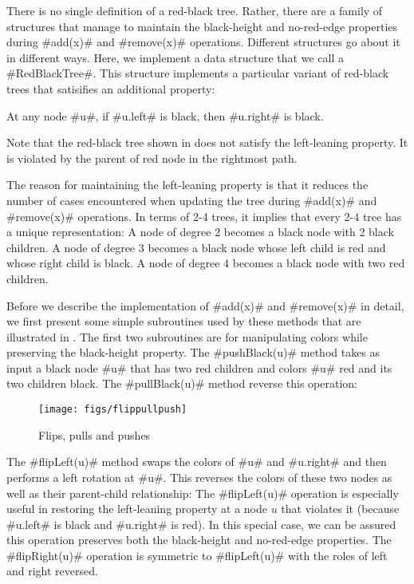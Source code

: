 There is no single definition of a red-black tree.  Rather,
there are a family of structures that manage to maintain the
black-height and no-red-edge properties during #add(x)# and #remove(x)#
operations. Different structures go about it in different ways.  Here, we
implement a data structure that we call a #RedBlackTree#.  This structure
implements a particular variant of red-black trees that satisifies an
additional property:
\begin{prp}
  At any node #u#, if #u.left# is black, then #u.right# is black.
\end{prp}
Note that the red-black tree shown in   does
not satisfy the left-leaning property.  It is violated by the parent of
red node in the rightmost path.

The reason for maintaining the left-leaning property is that it reduces
the number of cases encountered when updating the tree during #add(x)#
and #remove(x)# operations.  In terms of 2-4 trees, it implies that
every 2-4 tree has a unique representation:  A node of degree 2 becomes
a black node with 2 black children.  A node of degree 3 becomes a black
node whose left child is red and whose right child is black.  A node of
degree 4 becomes a black node with two red children.

Before we describe the implementation of #add(x)# and #remove(x)# in
detail, we first present some simple subroutines used by these methods
that are illustrated in .  The first two
subroutines are for manipulating colors while preserving the black-height
property. The #pushBlack(u)# method takes as input a black node #u#
that has two red children and colors #u# red and its two children black.
The #pullBlack(u)# method reverse this operation:

\begin{figure}
  \begin{center}
    \texttt{[image: figs/flippullpush]}
  \end{center}
  \caption{Flips, pulls and pushes}
\end{figure}

The #flipLeft(u)# method swaps the colors of #u# and #u.right# and
then performs a left rotation at #u#.  This reverses the colors
of these two nodes as well as their parent-child relationship:
 The #flipLeft(u)# operation
is especially useful in restoring the left-leaning property at a node
$u$ that violates it (because #u.left# is black and #u.right# is red).
In this special case, we can be assured this operation preserves both the
black-height and no-red-edge properties.  The #flipRight(u)# operation
is symmetric to #flipLeft(u)# with the roles of left and right reversed.

